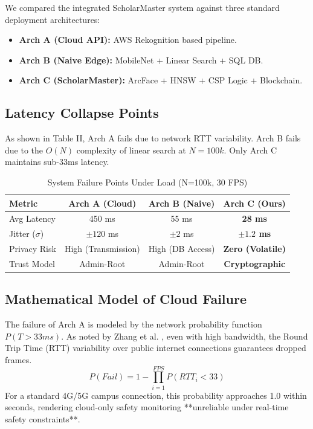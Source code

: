 \documentclass[conference]{IEEEtran}
\begin{document}
We compared the integrated ScholarMaster system against three standard deployment architectures:
\begin{itemize}
    \item \textbf{Arch A (Cloud API):} AWS Rekognition based pipeline.
    \item \textbf{Arch B (Naive Edge):} MobileNet + Linear Search + SQL DB.
    \item \textbf{Arch C (ScholarMaster):} ArcFace + HNSW + CSP Logic + Blockchain.
\end{itemize}

\subsection{Latency Collapse Points}
As shown in Table II, Arch A fails due to network RTT variability. Arch B fails due to the $O(N)$ complexity of linear search at $N=100k$. Only Arch C maintains sub-33ms latency.

\begin{table}[htbp]
\caption{System Failure Points Under Load (N=100k, 30 FPS)}
\begin{center}
\begin{tabular}{lccc}
\toprule
\textbf{Metric} & \textbf{Arch A (Cloud)} & \textbf{Arch B (Naive)} & \textbf{Arch C (Ours)} \\
\midrule
Avg Latency & 450 ms & 55 ms & \textbf{28 ms} \\
Jitter ($\sigma$) & $\pm 120$ ms & $\pm 2$ ms & \textbf{$\pm 1.2$ ms} \\
Privacy Risk & High (Transmission) & High (DB Access) & \textbf{Zero (Volatile)} \\
Trust Model & Admin-Root & Admin-Root & \textbf{Cryptographic} \\
\bottomrule
\end{tabular}
\end{center}
\label{tab:failure}
\end{table}

\subsection{Mathematical Model of Cloud Failure}
The failure of Arch A is modeled by the network probability function $P(T > 33ms)$. As noted by Zhang et al. \cite{b10}, even with high bandwidth, the Round Trip Time (RTT) variability over public internet connections guarantees dropped frames.
\begin{equation}
P(Fail) = 1 - \prod_{i=1}^{FPS} P(RTT_i < 33)
\end{equation}
For a standard 4G/5G campus connection, this probability approaches 1.0 within seconds, rendering cloud-only safety monitoring **unreliable under real-time safety constraints**.
\end{document}
